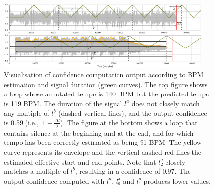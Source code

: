 \documentclass{article}
\begin{document}
\begin{figure}
 \centerline{
 \includegraphics[width=0.95\textwidth]{figs/confidence_measure_examples-crop.pdf}}
 \caption{Visualisation of confidence computation output according to BPM estimation and signal duration (green curves). The top figure shows a loop whose annotated tempo is 140 BPM but the predicted tempo is 119 BPM.
	The duration of the signal $l^a$ does not closely match any multiple of $l^b$ (dashed vertical lines), and the output confidence is 0.59 (i.e.,~$1 - \frac{\Delta l}{\lambda}$).
 The figure at the bottom shows a loop that contains silence at the beginning and at the end, and for which tempo has been correctly estimated as being 91 BPM.
 The yellow curve represents its envelope and the vertical dashed red lines the estimated effective start and end points.
 Note that $l_2^a$ closely matches a multiple of $l^b$, resulting in a confidence of 0.97. The output confidence computed with $l^{a}$, $l_0^{a}$ and $l_1^{a}$ produces lower values.}
 \label{fig:confidence_measure_examples}
\end{figure}
\end{document}
